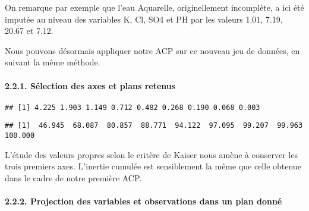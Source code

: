 \documentclass[]{article}
\newenvironment{Shaded}{\begin{snugshade}}{\end{snugshade}}
\newcommand{\KeywordTok}[1]{\textcolor[rgb]{0.13,0.29,0.53}{\textbf{#1}}}
\newcommand{\DecValTok}[1]{\textcolor[rgb]{0.00,0.00,0.81}{#1}}
\newcommand{\OperatorTok}[1]{\textcolor[rgb]{0.81,0.36,0.00}{\textbf{#1}}}
\newcommand{\NormalTok}[1]{#1}
\let\oldparagraph\paragraph
\renewcommand{\paragraph}[1]{\oldparagraph{#1}\mbox{}}
\begin{document}
On remarque par exemple que l'eau Aquarelle, originellement incomplète,
a ici été imputée au niveau des variables K, Cl, SO4 et PH par les
valeurs 1.01, 7.19, 20.67 et 7.12.

Nous pouvons désormais appliquer notre ACP sur ce nouveau jeu de
données, en suivant la même méthode.

\hypertarget{selection-des-axes-et-plans-retenus-1}{\paragraph{2.2.1.
Sélection des axes et plans
retenus}\label{selection-des-axes-et-plans-retenus-1}}

\begin{Shaded}
\end{Shaded}

\begin{verbatim}
## [1] 4.225 1.903 1.149 0.712 0.482 0.268 0.190 0.068 0.003
\end{verbatim}

\begin{Shaded}
\end{Shaded}

\begin{verbatim}
## [1]  46.945  68.087  80.857  88.771  94.122  97.095  99.207  99.963 100.000
\end{verbatim}

L'étude des valeurs propres selon le critère de Kaiser nous amène à
conserver les trois premiers axes. L'inertie cumulée est sensiblement la
même que celle obtenue dans le cadre de notre première ACP.

\hypertarget{projection-des-variables-et-observations-dans-un-plan-donne-1}{\paragraph{2.2.2.
Projection des variables et observations dans un plan
donné}\label{projection-des-variables-et-observations-dans-un-plan-donne-1}}
\end{document}
